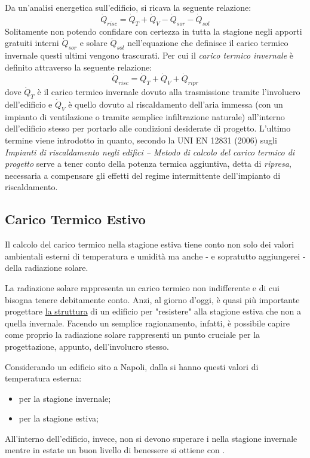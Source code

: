 Da un'analisi energetica sull'edificio, si ricava la seguente relazione:
\begin{equation}
	\dot{Q}_{risc}=\dot{Q}_T+\dot{Q}_V-\dot{Q}_{sor}-\dot{Q}_{sol}
\end{equation}
Solitamente non potendo confidare con certezza in tutta la stagione negli apporti gratuiti interni $\dot{Q}_{sor}$ e solare $\dot{Q}_{sol}$ nell'equazione che definisce il carico termico invernale questi ultimi vengono trascurati. Per cui il \emph{carico termico invernale} è definito attraverso la seguente relazione:
\begin{equation}
\dot{Q}_{risc}=\dot{Q}_T+\dot{Q}_V+\dot{Q}_{ripr}
\end{equation}
dove $\dot{Q}_T$ è il carico termico invernale dovuto alla trasmissione tramite l'involucro dell'edificio e $\dot{Q}_V$ è quello dovuto al riscaldamento dell'aria immessa (con un impianto di ventilazione o tramite semplice infiltrazione naturale) all'interno dell'edificio stesso per portarlo alle condizioni desiderate di progetto. L'ultimo termine viene introdotto in quanto, secondo la UNI EN 12831 (2006) sugli \emph{Impianti di riscaldamento negli edifici -- Metodo di calcolo del carico termico di progetto} serve a tener conto della potenza termica aggiuntiva, detta di \emph{ripresa}, necessaria a compensare gli effetti del regime intermittente dell'impianto di riscaldamento.

\subsection{Carico Termico Estivo}
Il calcolo del carico termico nella stagione estiva tiene conto non solo dei valori ambientali esterni di temperatura e umidità ma anche - e sopratutto aggiungerei - della radiazione solare.

La radiazione solare rappresenta un carico termico non indifferente e di cui bisogna tenere debitamente conto. Anzi, al giorno d'oggi, è quasi più importante progettare \underline{la struttura} di un edificio per "resistere" alla stagione estiva che non a quella invernale. Facendo un semplice ragionamento, infatti, è possibile capire come proprio la radiazione solare rappresenti un punto cruciale per la progettazione, appunto, dell'involucro stesso.

Considerando un edificio sito a Napoli, dalla \norvent si hanno questi valori di temperatura esterna:
\begin{itemize}
	\item {} per la stagione invernale;
	\item {} per la stagione estiva;
\end{itemize}
All'interno dell'edificio, invece, non si devono superare i  nella stagione invernale mentre in estate un buon livello di benessere si ottiene con .

